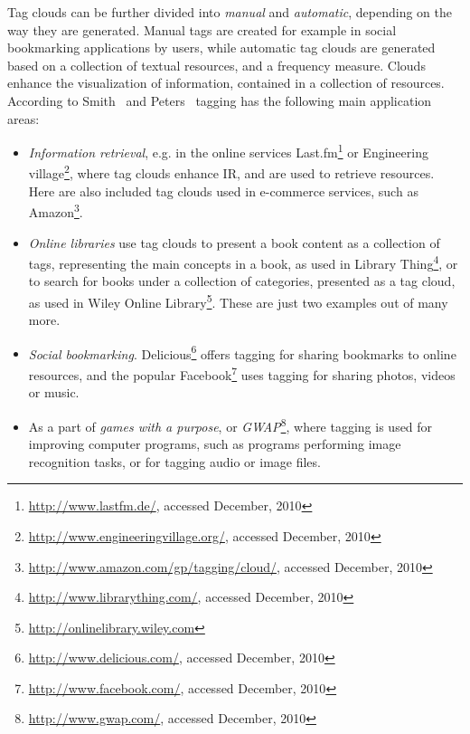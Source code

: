 Tag clouds can be further divided into \textit{manual} and \textit{automatic}, depending on the way they are generated. Manual tags are created for example in social bookmarking applications by users, while automatic tag clouds are generated based on a collection of textual resources, and a frequency measure. Clouds enhance the visualization of information, contained in a collection of resources. According to Smith~\cite{tagging2008} and Peters~\cite{folksonomiesWeb2.0_2009} tagging has the following main application areas: \\
\begin{itemize}
\item \textit{Information retrieval}, e.g. in the online services Last.fm\footnote{\url{http://www.lastfm.de/}, accessed December, 2010} or Engineering village\footnote{\url{http://www.engineeringvillage.org/}, accessed December, 2010}, where tag clouds enhance \gls{IR}, and are used to retrieve resources. Here are also included tag clouds used in e-commerce services, such as Amazon\footnote{\url{http://www.amazon.com/gp/tagging/cloud/}, accessed December, 2010}.

\item \textit{Online libraries} use tag clouds to present a book content as a collection of tags, representing the main concepts in a book, as used in Library Thing\footnote{\url{http://www.librarything.com/}, accessed December, 2010}, or to search for books under a collection of categories, presented as a tag cloud, as used in Wiley Online Library\footnote{\url{http://onlinelibrary.wiley.com}}. These are just two examples out of many more. \\

\item \textit{Social bookmarking}. Delicious\footnote{\url{http://www.delicious.com/}, accessed December, 2010} offers tagging for sharing bookmarks to online resources, and the popular Facebook\footnote{\url{http://www.facebook.com/}, accessed December, 2010}  uses tagging for sharing photos, videos or music. \\

\item As a part of \textit{games with a purpose}, or \textit{GWAP}\footnote{\url{http://www.gwap.com/}, accessed December, 2010}, where tagging is used for improving computer programs, such as programs performing image recognition tasks, or for tagging audio or image files. \\ 
\end{itemize}

